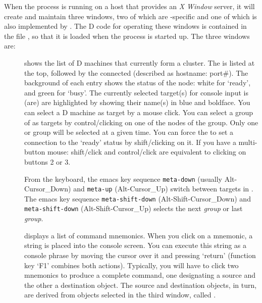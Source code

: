 When the  process is running on a host that provides an
\emph{X Window} server, it will create and maintain three windows, two
of which are -specific and one of which is also implemented
by . The D code for operating these windows is
contained in the file , so that it is loaded when
the  process is started up. The three windows are:

\begin{description}
\item[] shows the list of D machines that currently
  form a cluster. The  is listed at the top, followed by
  the connected  (described as hostname:
  port\#). The background of each entry shows the status of the node:
  white for `ready', and green for `busy'. The currently selected
  target(s) for console input is (are) are highlighted by showing
  their name(s) in blue and boldface. You can select a D machine as
  target by a mouse click. You can select a group of
   as targets by control/clicking on one of the
  nodes of the group. Only one  or group will be selected
  at a given time. You can force the  to set a
   connection to the `ready' status by shift/clicking on
  it. If you have a multi-button mouse: shift/click and control/click
  are equivalent to clicking on buttons 2 or 3.

  From the keyboard, the emacs key sequence \texttt{meta-down}
  (usually Alt-Cursor\_Down) and \texttt{meta-up} (Alt-Cursor\_Up)
  switch between targets in . The emacs key sequence
  \texttt{meta-shift-down} (Alt-Shift-Cursor\_Down) and
  \texttt{meta-shift-down} (Alt-Shift-Cursor\_Up) selects the next
  \emph{group} or last \emph{group}.

\item[] displays a list of command mnemonics. When you
  click on a mnemonic, a string is placed into the console screen. You
  can execute this string as a console phrase by moving the cursor
  over it and pressing `return' (function key `F1' combines both
  actions). Typically, you will have to click two mnemonics to produce
  a complete command, one designating a source and the other a
  destination object. The source and destination objects, in turn, are
  derived from objects selected in the third window, called
  .


\end{description}
